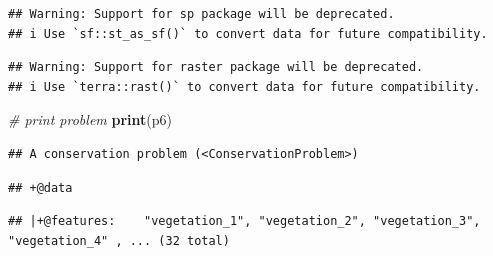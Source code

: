 \documentclass[12pt,]{book}
\newenvironment{Shaded}{\begin{snugshade}}{\end{snugshade}}
\newcommand{\CommentTok}[1]{\textcolor[rgb]{0.56,0.35,0.01}{\textit{#1}}}
\newcommand{\DataTypeTok}[1]{\textcolor[rgb]{0.13,0.29,0.53}{#1}}
\newcommand{\FloatTok}[1]{\textcolor[rgb]{0.00,0.00,0.81}{#1}}
\newcommand{\KeywordTok}[1]{\textcolor[rgb]{0.13,0.29,0.53}{\textbf{#1}}}
\newcommand{\NormalTok}[1]{#1}
\newcommand{\OperatorTok}[1]{\textcolor[rgb]{0.81,0.36,0.00}{\textbf{#1}}}
\newcommand{\OtherTok}[1]{\textcolor[rgb]{0.56,0.35,0.01}{#1}}
\newcommand{\StringTok}[1]{\textcolor[rgb]{0.31,0.60,0.02}{#1}}
\begin{document}
\begin{Shaded}
\end{Shaded}

\begin{verbatim}
## Warning: Support for sp package will be deprecated.
## i Use `sf::st_as_sf()` to convert data for future compatibility.
\end{verbatim}

\begin{verbatim}
## Warning: Support for raster package will be deprecated.
## i Use `terra::rast()` to convert data for future compatibility.
\end{verbatim}

\begin{Shaded}
\begin{Highlighting}[]
\CommentTok{# print problem}
\KeywordTok{print}\NormalTok{(p6)}
\end{Highlighting}
\end{Shaded}

\begin{verbatim}
## A conservation problem (<ConservationProblem>)
\end{verbatim}

\begin{verbatim}
## +@data
\end{verbatim}

\begin{verbatim}
## |+@features:    "vegetation_1", "vegetation_2", "vegetation_3", "vegetation_4" , ... (32 total)
\end{verbatim}
\end{document}

